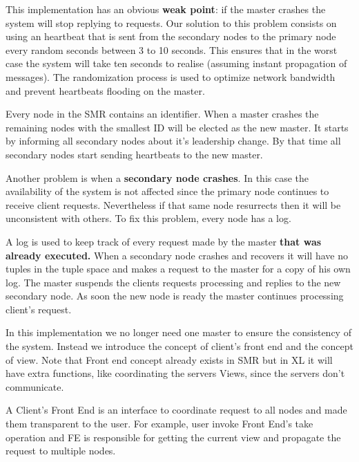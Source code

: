 \documentclass[times, 10pt,twocolumn]{article}
\begin{document}
This implementation has an obvious \textbf{weak point}: if the master crashes 
the system will stop replying to requests.
Our solution to this problem consists on using an heartbeat that is sent from the
secondary nodes to the primary node every random seconds between 3 to 10 seconds.
This ensures that in the worst case the system will take ten seconds to
realise  (assuming instant propagation of messages). 
The randomization process is used to optimize network bandwidth and
prevent heartbeats flooding on the master.

Every node in the SMR contains an identifier. When a master crashes the remaining
nodes with the smallest ID will be elected as the new master. It starts by informing
all secondary nodes about it's leadership change. By that time all secondary nodes
start sending heartbeats to the new master.

Another problem is when a \textbf{secondary node crashes}. In this case the
availability of the system is not affected since the primary node continues 
to receive client requests. Nevertheless if that same node resurrects then it
will be unconsistent with others. To fix this problem, every node has a log.

A log is used to keep track of every request made by the master 
\textbf{that was already executed.} When a secondary node crashes and recovers
it will have no tuples in the tuple space and makes a request to the master for
a copy of his own log. The master suspends the clients requests processing and
replies to the new secondary node. As soon the new node is ready the master
continues processing client's request.




In this implementation we no longer need one master to ensure the consistency of the system. 
Instead we introduce the concept of client's front end and the concept of view.
Note that Front end concept already exists in SMR but in XL it will have extra functions,
like coordinating the servers Views, since the servers don't communicate.

A Client's Front End is an interface to coordinate request to all nodes and made
them transparent to the user. For example, user invoke Front End's take operation
and FE is responsible for getting the current view and propagate the request
to multiple nodes.
\end{document}
